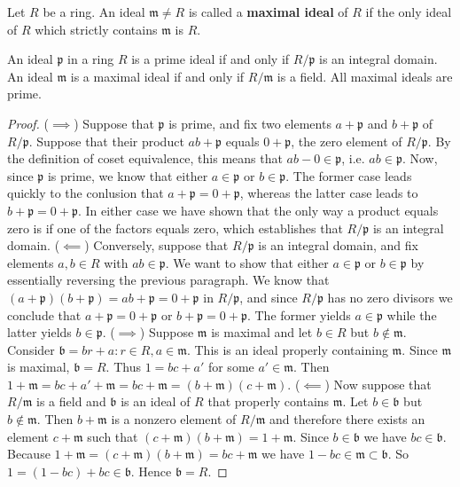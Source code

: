 \documentclass[english,bachelor]{liumaiex}
\begin{document}
\begin{define}
Let $R$ be a ring. An ideal $\mathfrak{m}\neq R$ is called a \textbf{maximal ideal} of $R$ if the only ideal of $R$ which strictly contains $\mathfrak{m}$ is $R$.
\end{define}
\begin{thm}
An ideal $\mathfrak{p}$ in a ring $R$ is a prime ideal if and only if $R/\mathfrak{p}$ is an integral domain. An ideal $\mathfrak{m}$ is a maximal ideal if and only if $R/\mathfrak{m}$ is a field. All maximal ideals are prime.
\end{thm}
\begin{proof}
($\implies$) Suppose that $\mathfrak{p}$ is prime, and fix two elements $a+\mathfrak{p}$ and $b+\mathfrak{p}$ of $R/\mathfrak{p}.$ Suppose that their product $ab + \mathfrak{p}$ equals $0+\mathfrak{p}$, the zero element of $R/\mathfrak{p}$. By the definition of coset equivalence, this means that $ab-0\in\mathfrak{p}$, i.e. $ab\in\mathfrak{p}.$ Now, since $\mathfrak{p}$ is prime, we know that either $a\in\mathfrak{p}$ or $b\in\mathfrak{p}$. The former case leads quickly to the conlusion that $a+\mathfrak{p}=0+\mathfrak{p}$, whereas the latter case leads to $b+\mathfrak{p}=0+\mathfrak{p}$. In either case we have shown that the only way a product equals zero is if one of the factors equals zero, which establishes that $R/\mathfrak{p}$ is an integral domain. \newline
($\impliedby$) Conversely, suppose that $R/\mathfrak{p}$ is an integral domain, and fix elements $a,b\in R$ with $ab \in \mathfrak{p}$. We want to show that either $a\in\mathfrak{p}$ or $b\in\mathfrak{p}$ by essentially reversing the previous paragraph. We know that $(a+\mathfrak{p})(b+\mathfrak{p})=ab+\mathfrak{p}=0+\mathfrak{p}$ in $R/\mathfrak{p}$, and since $R/\mathfrak{p}$ has no zero divisors we conclude that $a+\mathfrak{p}=0+\mathfrak{p}$ or $b+\mathfrak{p}=0+\mathfrak{p}$. The former yields $a\in\mathfrak{p}$ while the latter yields $b\in\mathfrak{p}.$\newline \newline
($\implies$) Suppose $\mathfrak{m}$ is maximal and let $b\in R$ but $b\notin\mathfrak{m}$. Consider $\mathfrak{b}={br+a : r\in R,a\in \mathfrak{m}}$. This is an ideal properly containing $\mathfrak{m}$. Since $\mathfrak{m}$ is maximal, $\mathfrak{b}=R$. Thus $1=bc+a'$ for some $a'\in\mathfrak{m}$. Then $1+\mathfrak{m}=bc+a'+\mathfrak{m}=bc+\mathfrak{m}=(b+\mathfrak{m})(c+\mathfrak{m})$. \newline
($\impliedby$) Now suppose that $R/\mathfrak{m}$ is a field and $\mathfrak{b}$ is an ideal of $R$ that properly contains $\mathfrak{m}$. Let $b\in\mathfrak{b}$ but $b\notin\mathfrak{m}$. Then $b+\mathfrak{m}$ is a nonzero element of $R/\mathfrak{m}$ and therefore there exists an element $c+\mathfrak{m}$ such that $(c+\mathfrak{m})(b+\mathfrak{m})=1+\mathfrak{m}$. Since $b\in\mathfrak{b}$ we have $bc\in\mathfrak{b}$. Because $1+\mathfrak{m}=(c+\mathfrak{m})(b+\mathfrak{m})=bc+\mathfrak{m}$ we have $1-bc\in\mathfrak{m}\subset\mathfrak{b}$. So $1=(1-bc)+bc\in\mathfrak{b}$. Hence $\mathfrak{b}=R$.\newline \newline

\end{proof}
\end{document}
